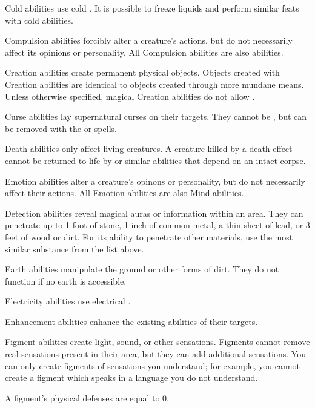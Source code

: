      Cold abilities use cold . It is possible to freeze liquids and perform similar feats with cold abilities.

     Compulsion abilities forcibly alter a creature's actions, but do not necessarily affect its opinions or personality.
    All Compulsion abilities are also  abilities.

     Creation abilities create permanent physical objects.
    Objects created with Creation abilities are identical to objects created through more mundane means.
    Unless otherwise specified, magical Creation abilities do not allow .

     Curse abilities lay supernatural curses on their targets.
    They cannot be , but can be removed with the  or  spells.

     Death abilities only affect living creatures.
    A creature killed by a death effect cannot be returned to life by  or similar abilities that depend on an intact corpse.

     Emotion abilities alter a creature's opinons or personality, but do not necessarily affect their actions.
    All Emotion abilities are also Mind abilities.

     Detection abilities reveal magical auras or information within an area.
    They can penetrate up to 1 foot of stone, 1 inch of common metal, a thin sheet of lead, or 3 feet of wood or dirt.
    For its ability to penetrate other materials, use the most similar substance from the list above.

     Earth abilities manipulate the ground or other forms of dirt.
    They do not function if no earth is accessible.

     Electricity abilities use electrical .

     Enhancement abilities enhance the existing abilities of their targets.

     Figment abilities create light, sound, or other sensations.
    Figments cannot remove real sensations present in their area, but they can add additional sensations.
    You can only create figments of sensations you understand; for example, you cannot create a figment which speaks in a language you do not understand.
    \par A figment's physical defenses are equal to 0.


